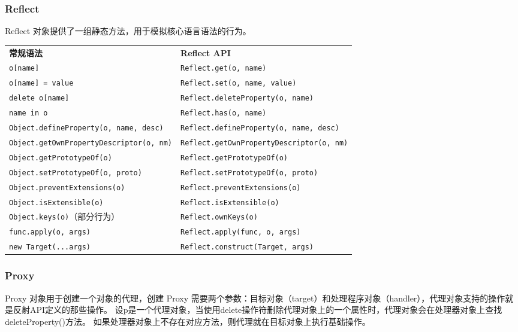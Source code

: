 \subsubsection{Reflect}
Reflect 对象提供了一组静态方法，用于模拟核心语言语法的行为。
\begin{table}[H]
	\centering
	\begin{tabular}{ll}
		\textbf{常规语法}                                   & \textbf{Reflect API}                             \\
		\verb|o[name]|                                  & \verb|Reflect.get(o, name)|                      \\
		\verb|o[name] = value|                          & \verb|Reflect.set(o, name, value)|               \\
		\verb|delete o[name]|                           & \verb|Reflect.deleteProperty(o, name)|           \\
		\verb|name in o|                                & \verb|Reflect.has(o, name)|                      \\
		\verb|Object.defineProperty(o, name, desc)|     & \verb|Reflect.defineProperty(o, name, desc)|     \\
		\verb|Object.getOwnPropertyDescriptor(o, nm)| & \verb|Reflect.getOwnPropertyDescriptor(o, nm)| \\
		\verb|Object.getPrototypeOf(o)|                 & \verb|Reflect.getPrototypeOf(o)|                 \\
		\verb|Object.setPrototypeOf(o, proto)|          & \verb|Reflect.setPrototypeOf(o, proto)|          \\
		\verb|Object.preventExtensions(o)|              & \verb|Reflect.preventExtensions(o)|              \\
		\verb|Object.isExtensible(o)|                   & \verb|Reflect.isExtensible(o)|                   \\
		\verb|Object.keys(o)|（部分行为）                     & \verb|Reflect.ownKeys(o)|                        \\
		\verb|func.apply(o, args)|                & \verb|Reflect.apply(func, o, args)|        \\
		\verb|new Target(...args)|                      & \verb|Reflect.construct(Target, args)|           \\
	\end{tabular}
\end{table}

\subsubsection{Proxy}
Proxy 对象用于创建一个对象的代理，创建 Proxy 需要两个参数：目标对象（target）和处理程序对象（handler），代理对象支持的操作就是反射API定义的那些操作。
设p是一个代理对象，当使用delete操作符删除代理对象上的一个属性时，代理对象会在处理器对象上查找deleteProperty()方法。
如果处理器对象上不存在对应方法，则代理就在目标对象上执行基础操作。

